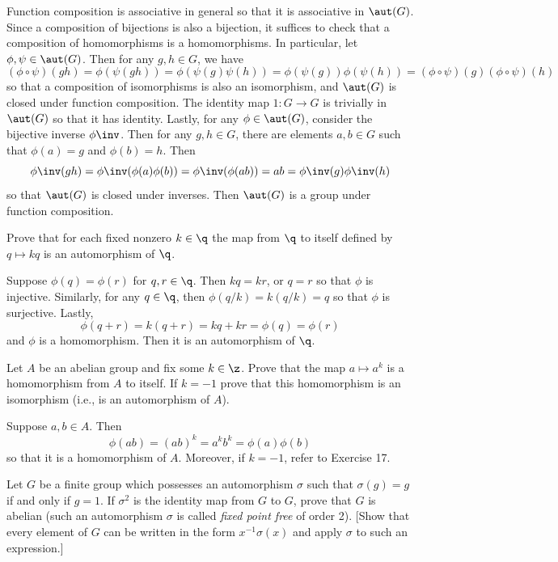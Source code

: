 \begin{problems}
    \begin{sol}
        Function composition is associative in general so that it is associative in $\aut(G)$. Since a composition of bijections is also a bijection, it suffices to check that a composition of homomorphisms is a homomorphisms. In particular, let $\phi, \psi \in \aut(G)$. Then for any $g, h \in G$, we have
        \[(\phi \circ \psi)(gh) = \phi(\psi(gh)) = \phi(\psi(g)\psi(h)) = \phi(\psi(g))\phi(\psi(h)) = (\phi \circ \psi)(g) (\phi \circ \psi)(h)\]
        so that a composition of isomorphisms is also an isomorphism, and $\aut(G)$ is closed under function composition. The identity map $1 : G \to G$ is trivially in $\aut(G)$ so that it has identity. Lastly, for any $\phi \in \aut(G)$, consider the bijective inverse $\phi\inv$. Then for any $g, h \in G$, there are elements $a, b \in G$ such that $\phi(a) = g$ and $\phi(b) = h$. Then
        \[\phi\inv(gh) = \phi\inv(\phi(a)\phi(b)) = \phi\inv(\phi(ab)) = ab = \phi\inv(g)\phi\inv(h)\]
        so that $\aut(G)$ is closed under inverses. Then $\aut(G)$ is a group under function composition.
    \end{sol}
    \item Prove that for each fixed nonzero $k \in \q$ the map from $\q$ to itself defined by $q \mapsto kq$ is an automorphism of $\q$.
    \begin{sol}
        Suppose $\phi(q) = \phi(r)$ for $q, r \in \q$. Then $kq = kr$, or $q = r$ so that $\phi$ is injective. Similarly, for any $q \in \q$, then $\phi(q/k) = k(q/k) = q$ so that $\phi$ is surjective. Lastly,
        \[\phi(q + r) = k(q + r) = kq + kr = \phi(q) = \phi(r)\]
        and $\phi$ is a homomorphism. Then it is an automorphism of $\q$.
    \end{sol}
    \item Let $A$ be an abelian group and fix some $k \in \z$. Prove that the map $a \mapsto a^k$ is a homomorphism from $A$ to itself. If $k = -1$ prove that this homomorphism is an isomorphism (i.e., is an automorphism of $A$).
    \begin{sol}
        Suppose $a, b \in A$. Then
        \[\phi(ab) = (ab)^k = a^kb^k = \phi(a)\phi(b)\]
        so that it is a homomorphism of $A$. Moreover, if $k = -1$, refer to Exercise 17.
    \end{sol}
    \item Let $G$ be a finite group which possesses an automorphism $\sigma$ such that $\sigma(g) = g$ if and only if $g = 1$. If $\sigma^2$ is the identity map from $G$ to $G$, prove that $G$ is abelian (such an automorphism $\sigma$ is called \emph{fixed point free} of order 2). [Show that every element of $G$ can be written in the form $x^{-1}\sigma(x)$ and apply $\sigma$ to such an expression.]

\end{problems}
